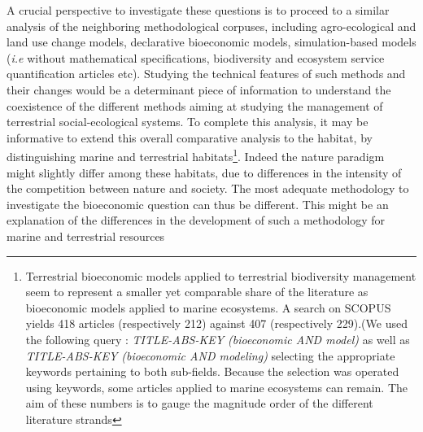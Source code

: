 A crucial perspective to investigate these questions is to proceed to a similar analysis of the neighboring methodological corpuses, including agro-ecological and land use change models, declarative bioeconomic models, simulation-based models (\textit{i.e} without mathematical specifications, biodiversity and ecosystem service quantification articles etc). Studying  the technical features of such methods and their changes would be a determinant piece of information to understand the coexistence of the different methods aiming at studying the management of terrestrial social-ecological systems.
To complete this analysis, it may be informative to extend this overall comparative analysis to the habitat, by distinguishing marine and terrestrial habitats\footnote{ Terrestrial bioeconomic models applied to terrestrial biodiversity management seem to represent a smaller yet comparable share of the literature as bioeconomic models applied to marine ecosystems.
A search on SCOPUS yields 418 articles (respectively 212) against 407 (respectively 229).(We used the following query : \textit{TITLE-ABS-KEY (bioeconomic AND model)} as well as \textit{TITLE-ABS-KEY (bioeconomic AND modeling)} selecting the appropriate keywords pertaining to both sub-fields. Because the selection was operated using keywords, some articles applied to marine ecosystems can remain. The aim of these numbers is to gauge the magnitude order of the different literature strands}. Indeed the nature paradigm might slightly differ among these habitats, due to differences in the intensity of the competition between nature and society. The most adequate methodology to investigate the bioeconomic question can thus be different. This might be an explanation of the differences in the development of such a methodology for marine and terrestrial resources



